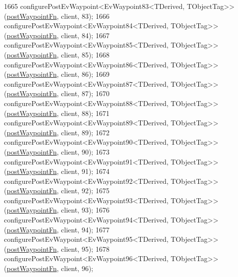 \begin{DoxyCode}
1665     configurePostEvWaypoint<EvWaypoint83<TDerived, TObjectTag>>(\hyperlink{classmove__base__z__client_1_1WaypointEventDispatcher_acc538eb7506c13f7cca2268a1742dadd}{postWaypointFn}, client, 83);
1666     configurePostEvWaypoint<EvWaypoint84<TDerived, TObjectTag>>(\hyperlink{classmove__base__z__client_1_1WaypointEventDispatcher_acc538eb7506c13f7cca2268a1742dadd}{postWaypointFn}, client, 84);
1667     configurePostEvWaypoint<EvWaypoint85<TDerived, TObjectTag>>(\hyperlink{classmove__base__z__client_1_1WaypointEventDispatcher_acc538eb7506c13f7cca2268a1742dadd}{postWaypointFn}, client, 85);
1668     configurePostEvWaypoint<EvWaypoint86<TDerived, TObjectTag>>(\hyperlink{classmove__base__z__client_1_1WaypointEventDispatcher_acc538eb7506c13f7cca2268a1742dadd}{postWaypointFn}, client, 86);
1669     configurePostEvWaypoint<EvWaypoint87<TDerived, TObjectTag>>(\hyperlink{classmove__base__z__client_1_1WaypointEventDispatcher_acc538eb7506c13f7cca2268a1742dadd}{postWaypointFn}, client, 87);
1670     configurePostEvWaypoint<EvWaypoint88<TDerived, TObjectTag>>(\hyperlink{classmove__base__z__client_1_1WaypointEventDispatcher_acc538eb7506c13f7cca2268a1742dadd}{postWaypointFn}, client, 88);
1671     configurePostEvWaypoint<EvWaypoint89<TDerived, TObjectTag>>(\hyperlink{classmove__base__z__client_1_1WaypointEventDispatcher_acc538eb7506c13f7cca2268a1742dadd}{postWaypointFn}, client, 89);
1672     configurePostEvWaypoint<EvWaypoint90<TDerived, TObjectTag>>(\hyperlink{classmove__base__z__client_1_1WaypointEventDispatcher_acc538eb7506c13f7cca2268a1742dadd}{postWaypointFn}, client, 90);
1673     configurePostEvWaypoint<EvWaypoint91<TDerived, TObjectTag>>(\hyperlink{classmove__base__z__client_1_1WaypointEventDispatcher_acc538eb7506c13f7cca2268a1742dadd}{postWaypointFn}, client, 91);
1674     configurePostEvWaypoint<EvWaypoint92<TDerived, TObjectTag>>(\hyperlink{classmove__base__z__client_1_1WaypointEventDispatcher_acc538eb7506c13f7cca2268a1742dadd}{postWaypointFn}, client, 92);
1675     configurePostEvWaypoint<EvWaypoint93<TDerived, TObjectTag>>(\hyperlink{classmove__base__z__client_1_1WaypointEventDispatcher_acc538eb7506c13f7cca2268a1742dadd}{postWaypointFn}, client, 93);
1676     configurePostEvWaypoint<EvWaypoint94<TDerived, TObjectTag>>(\hyperlink{classmove__base__z__client_1_1WaypointEventDispatcher_acc538eb7506c13f7cca2268a1742dadd}{postWaypointFn}, client, 94);
1677     configurePostEvWaypoint<EvWaypoint95<TDerived, TObjectTag>>(\hyperlink{classmove__base__z__client_1_1WaypointEventDispatcher_acc538eb7506c13f7cca2268a1742dadd}{postWaypointFn}, client, 95);
1678     configurePostEvWaypoint<EvWaypoint96<TDerived, TObjectTag>>(\hyperlink{classmove__base__z__client_1_1WaypointEventDispatcher_acc538eb7506c13f7cca2268a1742dadd}{postWaypointFn}, client, 96);

\end{DoxyCode}
